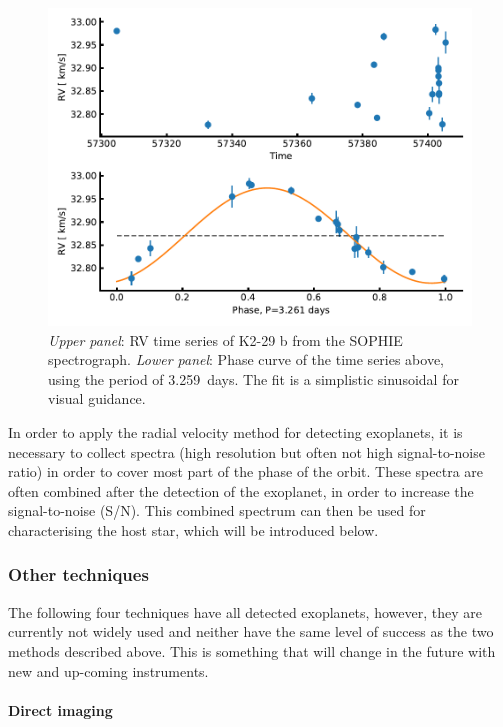 \begin{figure}[htpb!]
    \centering
    \includegraphics[width=1.0\linewidth]{figures/RVmethod.pdf}
    \caption{\emph{Upper panel}: RV time series of K2-29 b from the SOPHIE spectrograph.
             \emph{Lower panel}: Phase curve of the time series above, using the period of
             \SI{3.259}{days}. The fit is a simplistic sinusoidal for visual guidance.}
    \label{fig:rvmethod}
\end{figure}

In order to apply the radial velocity method for detecting exoplanets, it is necessary to collect
spectra (high resolution but often not high signal-to-noise ratio) in order to cover most part of
the phase of the orbit. These spectra are often combined after the detection of the exoplanet, in
order to increase the signal-to-noise (S/N). This combined spectrum can then be used for
characterising the host star, which will be introduced below.


\subsubsection{Other techniques}

The following four techniques have all detected exoplanets, however, they are currently not widely
used and neither have the same level of success as the two methods described above. This is
something that will change in the future with new and up-coming instruments.

\paragraph{Direct imaging}

